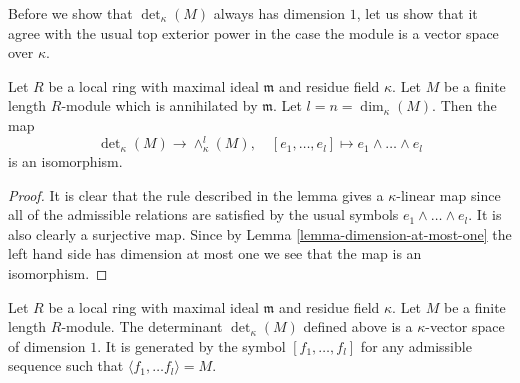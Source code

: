 \noindent
Before we show that $\det_\kappa(M)$ always has dimension $1$,
let us show that it agree with the usual top exterior power in
the case the module is a vector space over $\kappa$.

\begin{lemma}
\label{lemma-compare-det}
Let $R$ be a local ring with maximal ideal $\mathfrak m$ and
residue field $\kappa$. Let $M$ be a finite length $R$-module
which is annihilated by $\mathfrak m$. Let $l = n = \dim_\kappa(M)$.
Then the map
$$
\det\nolimits_\kappa(M) \longrightarrow \wedge^l_\kappa(M),
\quad
[e_1, \ldots, e_l] \longmapsto e_1 \wedge \ldots \wedge e_l
$$
is an isomorphism.
\end{lemma}

\begin{proof}
It is clear that the rule described in the lemma gives a $\kappa$-linear
map since all of the admissible relations are satisfied by the usual
symbols $e_1 \wedge \ldots \wedge e_l$. It is also clearly a surjective
map. Since by Lemma \ref{lemma-dimension-at-most-one} the left hand side
has dimension at most one
we see that the map is an isomorphism.
\end{proof}

\begin{lemma}
\label{lemma-determinant-dimension-one}
Let $R$ be a local ring with maximal ideal $\mathfrak m$ and
residue field $\kappa$. Let $M$ be a finite length $R$-module.
The determinant $\det_\kappa(M)$ defined above is a $\kappa$-vector
space of dimension $1$. It is generated by the symbol
$[f_1, \ldots, f_l]$ for any admissible sequence such
that $\langle f_1, \ldots f_l \rangle = M$.
\end{lemma}

